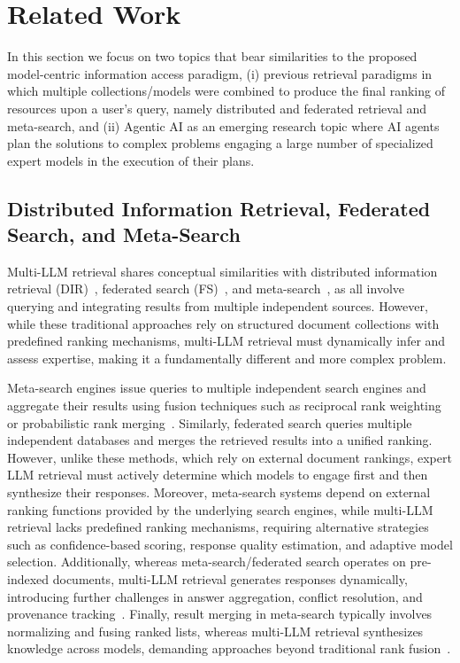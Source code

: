 \section{Related Work}

In this section we focus on two topics that bear similarities to the proposed model-centric information access paradigm, (i) previous retrieval paradigms in which multiple collections/models were combined to produce the final ranking of resources upon a user's query, namely distributed and federated retrieval and meta-search, and (ii) Agentic AI as an emerging research topic where AI agents plan the solutions to complex problems engaging a large number of specialized expert models in the execution of their plans.

\subsection{Distributed Information Retrieval, Federated Search, and Meta-Search}

Multi-LLM retrieval shares conceptual similarities with distributed information retrieval (DIR)~\cite{Callan1995, Callan2000, Crestani2013}, federated search (FS)~\cite{Shokouhi2009}, and meta-search~\cite{Glover2000metasearch, Chen2001Metasearch}, as all involve querying and integrating results from multiple independent sources. However, while these traditional approaches rely on structured document collections with predefined ranking mechanisms, multi-LLM retrieval must dynamically infer and assess expertise, making it a fundamentally different and more complex problem.

Meta-search engines issue queries to multiple independent search engines and aggregate their results using fusion techniques such as reciprocal rank weighting or probabilistic rank merging~\cite{Glover2000metasearch}. Similarly, federated search queries multiple independent databases and merges the retrieved results into a unified ranking. However, unlike these methods, which rely on external document rankings, expert LLM retrieval must actively determine which models to engage first and then synthesize their responses. Moreover, meta-search systems depend on external ranking functions provided by the underlying search engines, while multi-LLM retrieval lacks predefined ranking mechanisms, requiring alternative strategies such as confidence-based scoring, response quality estimation, and adaptive model selection. Additionally, whereas meta-search/federated search operates on pre-indexed documents, multi-LLM retrieval generates responses dynamically, introducing further challenges in answer aggregation, conflict resolution, and provenance tracking~\cite{Glover2001metasearcharchitecture}. Finally, result merging in meta-search typically involves normalizing and fusing ranked lists, whereas multi-LLM retrieval synthesizes knowledge across models, demanding approaches beyond traditional rank fusion~\cite{Shokouhi2009}.

